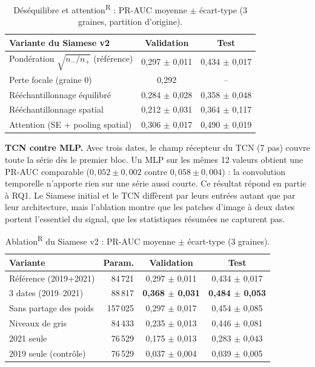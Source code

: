 \documentclass[10pt,a4paper,twocolumn]{article}
\newcommand{\retro}{\textcolor{retro}{\textsuperscript{\textsf{R}}}}
\begin{document}
\begin{table}[t]
\centering\small
\caption{Déséquilibre et attention\retro{} : PR-AUC moyenne $\pm$ écart-type (3 graines, partition d'origine).}
\label{tab:var}
\footnotesize\setlength{\tabcolsep}{2.5pt}
\begin{tabular}{@{}lcc@{}}
\toprule
Variante du Siamese v2 & Validation & Test \\
\midrule
Pondération $\sqrt{n_-/n_+}$ (référence) & 0,297 $\pm$ 0,011 & 0,434 $\pm$ 0,017 \\
Perte focale (graine 0) & 0,292 & -- \\
Rééchantillonnage équilibré & 0,284 $\pm$ 0,028 & 0,358 $\pm$ 0,048 \\
Rééchantillonnage spatial & 0,212 $\pm$ 0,031 & 0,364 $\pm$ 0,117 \\
Attention (SE + pooling spatial) & 0,306 $\pm$ 0,017 & 0,490 $\pm$ 0,019 \\
\bottomrule
\end{tabular}
\end{table}

\textbf{TCN contre MLP.} Avec trois dates, le champ récepteur du TCN (7 pas) couvre toute la série dès le premier bloc. Un MLP
sur les mêmes 12 valeurs obtient une PR-AUC comparable ($0{,}052\pm0{,}002$ contre $0{,}058\pm0{,}004$) : la convolution
temporelle n'apporte rien sur une série aussi courte. Ce résultat répond en partie à RQ1. Le Siamese initial et le TCN
diffèrent par leurs entrées autant que par leur architecture, mais l'ablation montre que les patches d'image à deux dates
portent l'essentiel du signal, que les statistiques résumées ne capturent pas.

\begin{table}[t]
\centering\footnotesize
\caption{Ablation\retro{} du Siamese v2 : PR-AUC moyenne $\pm$ écart-type (3 graines).}
\label{tab:abl}
\setlength{\tabcolsep}{2.5pt}
\begin{tabular}{@{}lrcc@{}}
\toprule
Variante & Param. & Validation & Test \\
\midrule
Référence (2019+2021) & 84\,721 & 0,297 $\pm$ 0,011 & 0,434 $\pm$ 0,017 \\
3 dates (2019--2021) & 88\,817 & \textbf{0,368 $\pm$ 0,031} & \textbf{0,484 $\pm$ 0,053} \\
Sans partage des poids & 157\,025 & 0,297 $\pm$ 0,017 & 0,454 $\pm$ 0,085 \\
Niveaux de gris & 84\,433 & 0,235 $\pm$ 0,013 & 0,446 $\pm$ 0,081 \\
2021 seule & 76\,529 & 0,175 $\pm$ 0,013 & 0,283 $\pm$ 0,043 \\
2019 seule (contrôle) & 76\,529 & 0,037 $\pm$ 0,004 & 0,039 $\pm$ 0,005 \\
\bottomrule
\end{tabular}
\end{table}
\end{document}
